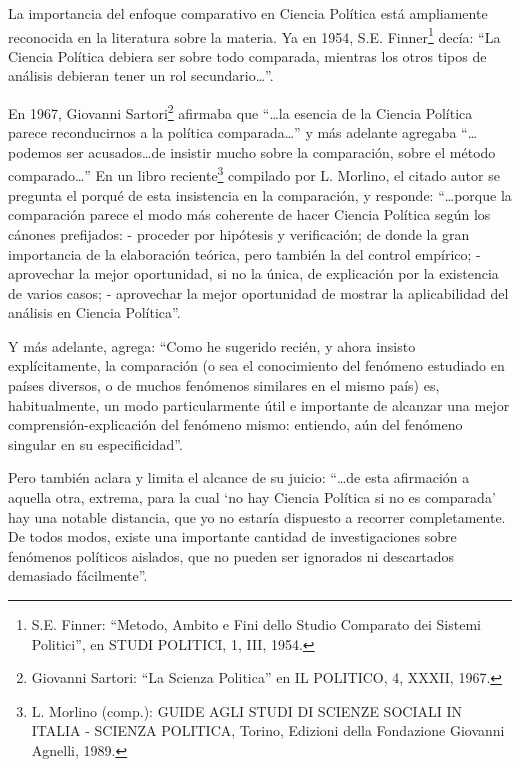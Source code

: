 \documentclass[
]{book}
\begin{document}
La importancia del enfoque comparativo en Ciencia Política está ampliamente reconocida en la literatura sobre la materia. Ya en 1954, S.E. Finner\footnote{S.E. Finner: ``Metodo, Ambito e Fini dello Studio Comparato dei Sistemi Politici'', en STUDI POLITICI, 1, III, 1954.} decía: ``La Ciencia Política debiera ser sobre todo comparada, mientras los otros tipos de análisis debieran tener un rol secundario\ldots{}''.

En 1967, Giovanni Sartori\footnote{Giovanni Sartori: ``La Scienza Politica'' en IL POLITICO, 4, XXXII, 1967.} afirmaba que ``\ldots la esencia de la Ciencia Política parece reconducirnos a la política comparada\ldots{}'' y más adelante agregaba ``\ldots podemos ser acusados\ldots de insistir mucho sobre la comparación, sobre el método comparado\ldots{}'' En un libro reciente\footnote{L. Morlino (comp.): GUIDE AGLI STUDI DI SCIENZE SOCIALI IN ITALIA - SCIENZA POLITICA, Torino, Edizioni della Fondazione Giovanni Agnelli, 1989.} compilado por L. Morlino, el citado autor se pregunta el porqué de esta insistencia en la comparación, y responde: ``\ldots porque la comparación parece el modo más coherente de hacer Ciencia Política según los cánones prefijados: - proceder por hipótesis y verificación; de donde la gran importancia de la elaboración teórica, pero también la del control empírico; - aprovechar la mejor oportunidad, si no la única, de explicación por la existencia de varios casos; - aprovechar la mejor oportunidad de mostrar la aplicabilidad del análisis en Ciencia Política''.

Y más adelante, agrega: ``Como he sugerido recién, y ahora insisto explícitamente, la comparación (o sea el conocimiento del fenómeno estudiado en países diversos, o de muchos fenómenos similares en el mismo país) es, habitualmente, un modo particularmente útil e importante de alcanzar una mejor comprensión-explicación del fenómeno mismo: entiendo, aún del fenómeno singular en su especificidad''.

Pero también aclara y limita el alcance de su juicio: ``\ldots de esta afirmación a aquella otra, extrema, para la cual `no hay Ciencia Política si no es comparada' hay una notable distancia, que yo no estaría dispuesto a recorrer completamente. De todos modos, existe una importante cantidad de investigaciones sobre fenómenos políticos aislados, que no pueden ser ignorados ni descartados demasiado fácilmente''.
\end{document}
